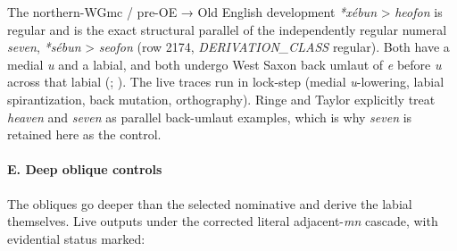 \documentclass[
  british,
  a4paper,
]{article}
\begin{document}
The northern-WGmc / pre-OE → Old English development \emph{*xébun}
\textgreater{} \emph{heofon} is regular and is the exact structural
parallel of the independently regular numeral \emph{seven},
\emph{*sébun} \textgreater{} \emph{seofon} (row 2174,
\emph{DERIVATION\_CLASS} regular). Both have a medial \emph{u} and a
labial, and both undergo West Saxon back umlaut of \emph{e} before
\emph{u} across that labial (; ). The live
traces run in lock-step (medial \emph{u}-lowering, labial
spirantization, back mutation, orthography). Ringe and Taylor explicitly
treat \emph{heaven} and \emph{seven} as parallel back-umlaut examples,
which is why \emph{seven} is retained here as the control.

\paragraph{E. Deep oblique controls}\label{e.-deep-oblique-controls}

The obliques go deeper than the selected nominative and derive the
labial themselves. Live outputs under the corrected literal
adjacent-\emph{mn} cascade, with evidential status marked:
\end{document}
